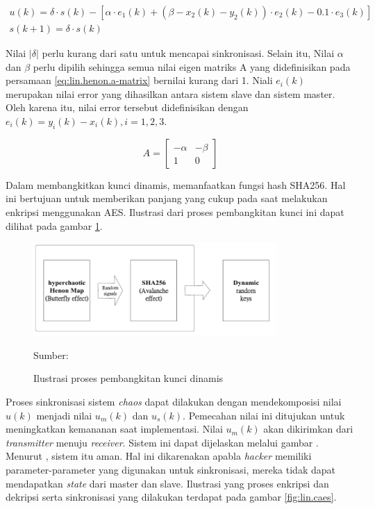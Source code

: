 \begin{equation}
  \label{eq:lin.henon.sync}
  \begin{array}{l}   
    u(k) = \delta \cdot s(k) - [\alpha \cdot e_1(k) + (\beta - x_2(k) - y_2(k)) \cdot e_2(k) - 0.1 \cdot e_3(k)]\\
    s(k+1) = \delta \cdot s(k)
  \end{array}
\end{equation}

Nilai $|\delta|$ perlu kurang dari satu untuk mencapai sinkronisasi. Selain itu, Nilai $\alpha$ dan $\beta$ perlu dipilih sehingga semua nilai eigen matriks A yang didefinisikan pada persamaan \ref{eq:lin.henon.a-matrix} bernilai kurang dari 1. Niali $e_i(k)$ merupakan nilai error yang dihasilkan antara sistem slave dan sistem master. Oleh karena itu, nilai error tersebut didefinisikan dengan $e_i(k) = y_i(k) - x_i(k), i = 1,2,3$.

\begin{equation}
\label{eq:lin.henon.a-matrix}
A = \begin{bmatrix}
  -\alpha & -\beta \\
  1 & 0 
  \end{bmatrix}
\end{equation}

Dalam membangkitkan kunci dinamis, \textcite{lin2021} memanfaatkan fungsi hash SHA256. Hal ini bertujuan untuk memberikan panjang yang cukup pada saat melakukan enkripsi menggunakan AES. Ilustrasi dari proses pembangkitan kunci ini dapat dilihat pada gambar \ref{fig:lin.keygen}.

\begin{figure}[!h]
  \centering
  \includegraphics[width=350px]{chapters/res/chapter-2/img/lin.keygen.png}
  \caption{Ilustrasi proses pembangkitan kunci dinamis} \label{fig:lin.keygen}
  Sumber: \textcite{lin2021}
\end{figure}

Proses sinkronisasi sistem \emph{chaos} dapat dilakukan dengan mendekomposisi nilai $u(k)$ menjadi nilai $u_m(k)$ dan $u_s(k)$. Pemecahan nilai ini ditujukan untuk meningkatkan kemananan saat implementasi. Nilai $u_m(k)$ akan dikirimkan dari \emph{transmitter} menuju \emph{receiver}. Sistem ini dapat dijelaskan melalui gambar . Menurut \textcite{lin2021}, sistem itu aman. Hal ini dikarenakan apabla \emph{hacker} memiliki parameter-parameter yang digunakan untuk sinkronisasi, mereka tidak dapat mendapatkan \emph{state} dari master dan slave. Ilustrasi yang proses enkripsi dan dekripsi serta sinkronisasi yang dilakukan terdapat pada gambar \ref{fig:lin.caes}.

